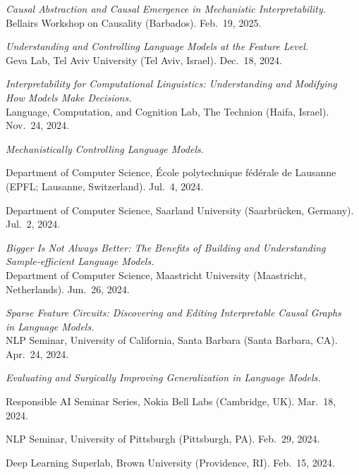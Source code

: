 \documentclass[10pt]{article}
\newcommand{\halfblankline}{\quad\vspace{-0.5\baselineskip}\pagebreak[3]}
\begin{document}
	\emph{Causal Abstraction and Causal Emergence in Mechanistic Interpretability.}\\
	Bellairs Workshop on Causality (Barbados). Feb.\ 19, 2025.

	\halfblankline

	\emph{Understanding and Controlling Language Models at the Feature Level.}\\
	Geva Lab, Tel Aviv University (Tel Aviv, Israel). Dec.\ 18, 2024.

	\halfblankline

	\emph{Interpretability for Computational Linguistics: Understanding and Modifying\\How Models Make Decisions.}\\
	Language, Computation, and Cognition Lab, The Technion (Haifa, Israel). Nov.\ 24, 2024.

	\halfblankline

	\emph{Mechanistically Controlling Language Models.}
	\begin{innerlist}
	\item Department of Computer Science, École polytechnique fédérale de Lausanne (EPFL; Lausanne, Switzerland). Jul.\ 4, 2024.
	\item Department of Computer Science, Saarland University (Saarbrücken, Germany). Jul.\ 2, 2024.
	\end{innerlist}
	
	\halfblankline
	
	\emph{Bigger Is Not Always Better: The Benefits of Building and Understanding\\Sample-efficient Language Models.}\\Department of Computer Science, Maastricht University (Maastricht, Netherlands). Jun.\ 26, 2024.
	
	\halfblankline

	\emph{Sparse Feature Circuits: Discovering and Editing Interpretable Causal Graphs\\in Language Models.}\\NLP Seminar, University of California, Santa Barbara (Santa Barbara, CA). Apr.\ 24, 2024.

	\halfblankline

	\emph{Evaluating and Surgically Improving Generalization in Language Models.}
	\begin{innerlist}
	\item Responsible AI Seminar Series, Nokia Bell Labs (Cambridge, UK). Mar.\ 18, 2024.
	\item NLP Seminar, University of Pittsburgh (Pittsburgh, PA). Feb.\ 29, 2024.
	\item Deep Learning Superlab, Brown University (Providence, RI). Feb.\ 15, 2024.
	\end{innerlist}
\end{document}
